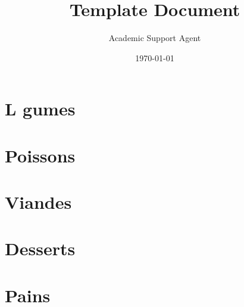 \documentclass{article}
\title{Template Document}
\author{Academic Support Agent}
\date{\today}
\begin{document}
\maketitle



\maketitle


\chapter{L gumes}


\chapter{Poissons}



\chapter{Viandes}




\chapter{Desserts}









\chapter{Pains}
\end{document}
